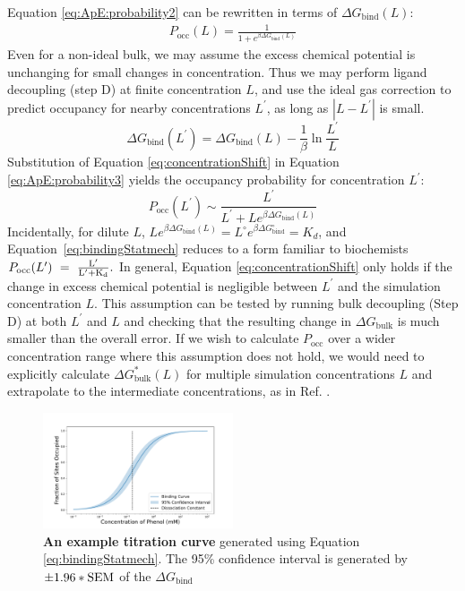 \documentclass[9pt,tutorial]{Styling/livecoms}
\begin{document}
Equation \ref{eq:ApE:probability2} can be rewritten in terms of $\Delta G_\mathrm{bind}(L)$:  
\begin{align}
 P_\mathrm{occ}(L) = \frac{1}{1+e^{\beta \Delta G_\mathrm{bind}(L)}} \label{eq:ApE:probability3}
\end{align}
Even for a non-ideal bulk, we may assume the excess chemical potential is unchanging for small changes in concentration. Thus we may perform ligand decoupling (step D) at finite concentration $L$, and use the ideal gas correction to predict occupancy for nearby concentrations $L^\prime$, as long as $|L-L^\prime|$ is small.
\begin{equation}
\label{eq:concentrationShift}
    \Delta G_\mathrm{bind}(L^\prime)= \Delta G_\mathrm{bind}(L)-\frac{1}{\beta} \ln \frac{L^\prime}{L}
\end{equation}
Substitution of Equation \ref{eq:concentrationShift} in Equation \ref{eq:ApE:probability3} yields the occupancy probability for concentration $L^\prime$:
\begin{equation}\label{eq:bindingStatmech}
    P_\mathrm{occ}(L^\prime)\sim\frac{L^\prime}{L^\prime+{L}e^{\beta \Delta G_\mathrm{bind}(L)}}
    \end{equation} 
Incidentally, for dilute $L$, ${L}e^{\beta \Delta G_\mathrm{bind}(L)}={L^\circ}e^{\beta \Delta G^\circ_\mathrm{bind}}=K_d$,
and Equation~\ref{eq:bindingStatmech} reduces to  a form familiar to biochemists 
$
    P_\mathrm{occ}(L^\prime)~=~\rm\frac{L^\prime}{L^\prime+K_d}.
$
In general, Equation \ref{eq:concentrationShift} only holds if the change in excess chemical potential is negligible between $L^\prime$ and the simulation concentration $L$.
This assumption can be tested by running bulk decoupling (Step D) at both $L^\prime$ and $L$ and checking that the resulting change in $\Delta G_\mathrm{bulk}$ is much smaller than the overall error. If we wish to calculate $P_\mathrm{occ}$ over a wider concentration range where this assumption does not hold, we would need to explicitly calculate $\Delta G^*_\mathrm{bulk}(L)$ for multiple simulation concentrations $L$ and extrapolate to the intermediate concentrations, as in Ref. \cite{Salari2018}.
\begin{figure}[!htb]
    \centering
    \includegraphics[width=0.5\textwidth]{titration_curve}
    \caption{\textbf{An example titration curve} generated using Equation \ref{eq:bindingStatmech}. The 95\% confidence interval is generated by $\pm 1.96*\rm SEM$ of the $\Delta G_\mathrm{bind}$}
    \label{fig:titrationCurve}  
\end{figure}
\end{document}
